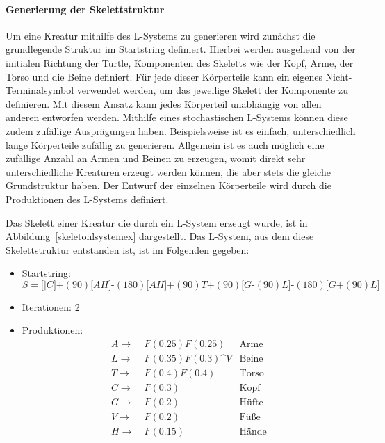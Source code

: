 \paragraph{Generierung der Skelettstruktur}
Um eine Kreatur mithilfe des L-Systems zu generieren wird zunächst die grundlegende Struktur im Startstring definiert.
Hierbei werden ausgehend von der initialen Richtung der Turtle, Komponenten des Skeletts wie der Kopf, Arme, der Torso und die Beine definiert.
Für jede dieser Körperteile kann ein eigenes Nicht-Terminalsymbol verwendet werden, um das jeweilige Skelett der Komponente zu definieren.
Mit diesem Ansatz kann jedes Körperteil unabhängig von allen anderen entworfen werden.
Mithilfe eines stochastischen L-Systems können diese zudem zufällige Ausprägungen haben.
Beispielsweise ist es einfach, unterschiedlich lange Körperteile zufällig zu generieren.
Allgemein ist es auch möglich eine zufällige Anzahl an Armen und Beinen zu erzeugen, womit direkt sehr unterschiedliche Kreaturen erzeugt werden können, die aber stets die gleiche Grundstruktur haben.
Der Entwurf der einzelnen Körperteile wird durch die Produktionen des L-Systems definiert.

Das Skelett einer Kreatur die durch ein L-System erzeugt wurde, ist in Abbildung~\ref{skeletonlsystemex} dargestellt.
Das L-System, aus dem diese Skelettstruktur entstanden ist, ist im Folgenden gegeben:
\begin{itemize}
	\item Startstring:
	      \begin{equation*}
		      S=\texttt{[}\texttt{|}C\texttt{]}\texttt{+}(90)\texttt{[}AH\texttt{]}\texttt{-}(180)\texttt{[}AH\texttt{]}\texttt{+}(90)T\texttt{+}(90)\texttt{[}G\texttt{-}(90)L\texttt{]}\texttt{-}(180)\texttt{[}G\texttt{+}(90)L\texttt{]}
	      \end{equation*}
	\item Iterationen: 2
	\item Produktionen:
	      \begin{align*}
		      A\rightarrow & ~F(0.25)F(0.25)                          & \text{Arme}  \\
		      L\rightarrow & ~F(0.35)F(0.3)\texttt{\textasciicircum}V & \text{Beine} \\
		      T\rightarrow & ~F(0.4)F(0.4)                            & \text{Torso} \\
		      C\rightarrow & ~F(0.3)                                  & \text{Kopf}  \\
		      G\rightarrow & ~F(0.2)                                  & \text{Hüfte} \\
		      V\rightarrow & ~F(0.2)                                  & \text{Füße}  \\
		      H\rightarrow & ~F(0.15)                                 & \text{Hände}
	      \end{align*}
\end{itemize}

